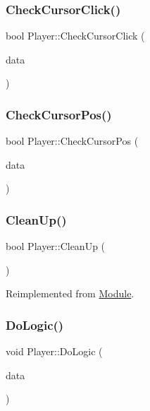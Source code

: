 \subsubsection{\texorpdfstring{CheckCursorClick()}{CheckCursorClick()}}
{\footnotesize\ttfamily bool Player\+::\+Check\+Cursor\+Click (\begin{DoxyParamCaption}\item[{\mbox{\hyperlink{class_u_i___element}{U\+I\+\_\+\+Element}} $\ast$}]{data }\end{DoxyParamCaption})}

\mbox{\label{class_player_a9be26181363a215e7a76562a042241ac}} 
\subsubsection{\texorpdfstring{CheckCursorPos()}{CheckCursorPos()}}
{\footnotesize\ttfamily bool Player\+::\+Check\+Cursor\+Pos (\begin{DoxyParamCaption}\item[{\mbox{\hyperlink{class_u_i___element}{U\+I\+\_\+\+Element}} $\ast$}]{data }\end{DoxyParamCaption})}

\mbox{\label{class_player_aebe8ef704dff5d2b676144c36f4217d8}} 
\subsubsection{\texorpdfstring{CleanUp()}{CleanUp()}}
{\footnotesize\ttfamily bool Player\+::\+Clean\+Up (\begin{DoxyParamCaption}{ }\end{DoxyParamCaption})\hspace{0.3cm}{\ttfamily [virtual]}}



Reimplemented from \mbox{\hyperlink{class_module_a77d7a006e42c0bd10110e1adbd4598cb}{Module}}.

\mbox{\label{class_player_ac4b7933fa90258aab8c40e5b5d53fa7e}} 
\subsubsection{\texorpdfstring{DoLogic()}{DoLogic()}}
{\footnotesize\ttfamily void Player\+::\+Do\+Logic (\begin{DoxyParamCaption}\item[{\mbox{\hyperlink{class_u_i___element}{U\+I\+\_\+\+Element}} $\ast$}]{data }\end{DoxyParamCaption})}

